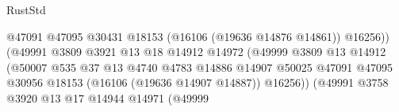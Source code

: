 \begin{lexlean}{RustStd}
\begin{coremodule}
                                                          @47091
                                                          @47095
                                                          @30431
                                                          @18153
                                                          (@16106 (@19636 @14876 @14861))
                                                          @16256))
                                                      (@49991
                                                        @3809
                                                        @3921
                                                        @13
                                                        @18
                                                        @14912
                                                        @14972
                                                        (@49999
                                                          @3809
                                                          @13
                                                          @14912
                                                          (@50007
                                                            @535
                                                            @37
                                                            @13
                                                            @4740
                                                            @4783
                                                            @14886
                                                            @14907
                                                            @50025
                                                            @47091
                                                            @47095
                                                            @30956
                                                            @18153
                                                            (@16106 (@19636 @14907 @14887))
                                                            @16256))
                                                        (@49991
                                                          @3758
                                                          @3920
                                                          @13
                                                          @17
                                                          @14944
                                                          @14971
                                                          (@49999

\end{coremodule}
\end{lexlean}

